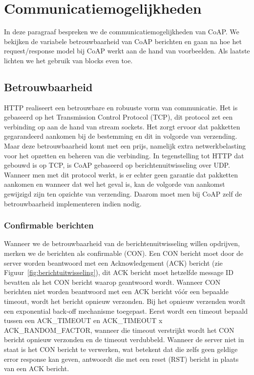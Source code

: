 \newpage

\section{Communicatiemogelijkheden} \label{communicatieMogelijkheden}

In deze paragraaf bespreken we de communicatiemogelijkheden van CoAP. We bekijken de variabele betrouwbaarheid van CoAP berichten en gaan na hoe het request/response model bij CoAP werkt aan de hand van voorbeelden. Als laatste lichten we het gebruik van blocks even toe.

\subsection{Betrouwbaarheid}

HTTP realiseert een betrouwbare en robuuste vorm van communicatie. Het is gebaseerd op het Transmission Control Protocol (TCP), dit protocol zet een verbinding op aan de hand van stream sockets. Het zorgt ervoor dat pakketten gegarandeerd aankomen bij de bestemming en dit in volgorde van verzending. Maar deze betrouwbaarheid komt met een prijs, namelijk extra netwerkbelasting voor het opzetten en beheren van die verbinding. In tegenstelling tot HTTP dat gebouwd is op TCP, is CoAP gebaseerd op berichtenuitwisseling over UDP. Wanneer men met dit protocol werkt, is er echter geen garantie dat pakketten aankomen en wanneer dat wel het geval is, kan de volgorde van aankomst gewijzigd zijn ten opzichte van verzending. Daarom moet men bij CoAP zelf de betrouwbaarheid implementeren indien nodig.

\subsubsection{Confirmable berichten}

Wanneer we de betrouwbaarheid van de berichtenuitwisseling willen opdrijven, merken we de berichten als confirmable (CON). Een CON bericht moet door de server worden beantwoord met een Acknowledgement (ACK) bericht (zie Figuur~\ref{fig:berichtuitwisseling}), dit ACK bericht moet hetzelfde message ID bevatten als het CON bericht waarop geantwoord wordt. Wanneer CON berichten niet worden beantwoord met een ACK bericht v\'{o}\'{o}r een bepaalde timeout, wordt het bericht opnieuw verzonden. Bij het opnieuw verzenden wordt een exponential back-off mechanisme toegepast. Eerst wordt een timeout bepaald tussen een ACK\_TIMEOUT en ACK\_TIMEOUT x ACK\_RANDOM\_FACTOR, wanneer die timeout verstrijkt wordt het CON bericht opnieuw verzonden en de timeout verdubbeld. Wanneer de server niet in staat is het CON bericht te verwerken, wat betekent dat die zelfs geen geldige error response kan geven, antwoordt die met een reset (RST) bericht in plaats van een ACK bericht.


